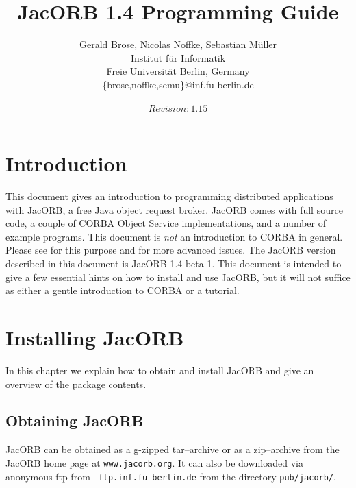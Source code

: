 \documentclass[12pt]{scrbook}
\title{JacORB 1.4 Programming Guide}
\author{Gerald Brose, Nicolas Noffke, Sebastian M\"uller\\
Institut f\"ur Informatik\\
Freie Universit\"at Berlin, Germany\\
\{brose,noffke,semu\}@inf.fu-berlin.de\\
\\
$Revision: 1.15 $
}
\begin{document}
\newcommand{\cmdline}[1]{\begin{small}\noindent \texttt{\$ #1}\end{small}}

\newcommand{\JacORBDir}{JacORB1\_4\_beta1}
\newcommand{\JacORBVersion}{1.4 beta 1}

\maketitle


\setlength{\parskip}{1.1ex}
\newpage
\tableofcontents

\chapter{Introduction}

This  document  gives   an  introduction  to  programming  distributed
applications with  JacORB, a free  Java object request  broker. JacORB
comes  with  full  source  code,  a couple  of  CORBA  Object  Service
implementations, and  a number of example programs.   This document is
{\it  not}   an  introduction  to   CORBA  in  general.    Please  see
\cite{Brose2001a,Siegel2000,   Vinoski1997}  for   this   purpose  and
\cite{Henning1999}  for  more  advanced  issues.  The  JacORB  version
described in this document  is JacORB \JacORBVersion. This document is
intended  to give  a few  essential hints  on how  to install  and use
JacORB, but  it will  not suffice as  either a gentle  introduction to
CORBA or a tutorial.


\chapter{Installing JacORB}
\label{Ch_installing}

In this chapter  we explain how to obtain and  install JacORB and give
an overview of the package contents.

\section{Obtaining JacORB}

JacORB can be obtained as a g-zipped tar--archive or as a zip--archive
from the  JacORB home page  at {\tt www.jacorb.org}.
It   can   also   be   downloaded   via  anonymous   ftp   from   {\tt
ftp.inf.fu-berlin.de} from the directory {\tt pub/jacorb/}.
\end{document}
